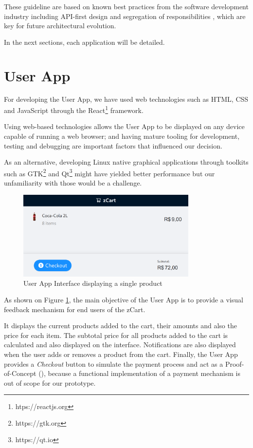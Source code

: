 \documentclass[openright]{normas-utf-tex} %
\begin{document}
These guideline are based on known best practices from the software 
development industry including API-first design and segregation of
responsibilities \cite{Sam2021,Kong2022}, which are key for future architectural
evolution.

In the next sections, each application will be  detailed.

\section{User App}

For developing the User App, we have used web technologies such 
as HTML, CSS \cite{Duckett2011} and JavaScript \cite{Flanagan2020} through the 
React\footnote{htps://reactjs.org} framework. 

Using web-based technologies allows the User App to be displayed on any 
device capable of running a web browser; and having mature tooling for 
development, testing and debugging are important factors that influenced 
our decision.

As an alternative, developing Linux native graphical applications through
toolkits such as GTK\footnote{https://gtk.org} and Qt\footnote{https://qt.io}
might have yielded better performance but our unfamiliarity with those would be
a challenge.

\begin{figure}[H]
	\centering
	\includegraphics[width=0.8\textwidth]{./images/ui.png}
	\caption[User App Interface display a single product]{User App Interface displaying a single product}
	\label{fig:userapp}
\end{figure}

As shown on Figure \ref{fig:userapp}, the main objective of the User App is to
provide a visual feedback mechanism for end users of the zCart.

It displays the current products added to the cart, their amounts and also the
price for each item. The subtotal price for all products added to the cart is
calculated and also displayed on the interface. Notifications are also
displayed when the user adds or removes a product from the cart. Finally, the
User App provides a \textit{Checkout} button to simulate the payment process
and act as a Proof-of-Concept (), because a functional
implementation of a payment mechanism is out of scope for our prototype.
\end{document}
